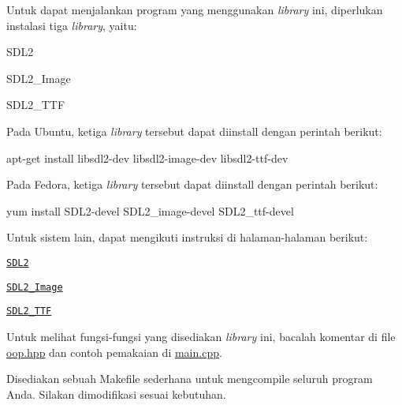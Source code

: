 Untuk dapat menjalankan program yang menggunakan {\itshape library} ini, diperlukan instalasi tiga {\itshape library}, yaitu\+:


\begin{DoxyItemize}
\item S\+D\+L2
\item S\+D\+L2\+\_\+\+Image
\item S\+D\+L2\+\_\+\+T\+TF
\end{DoxyItemize}

Pada Ubuntu, ketiga {\itshape library} tersebut dapat diinstall dengan perintah berikut\+: \begin{DoxyVerb}apt-get install libsdl2-dev libsdl2-image-dev libsdl2-ttf-dev
\end{DoxyVerb}


Pada Fedora, ketiga {\itshape library} tersebut dapat diinstall dengan perintah berikut\+: \begin{DoxyVerb}yum install SDL2-devel SDL2_image-devel SDL2_ttf-devel
\end{DoxyVerb}


Untuk sistem lain, dapat mengikuti instruksi di halaman-\/halaman berikut\+:
\begin{DoxyItemize}
\item \href{http://lazyfoo.net/tutorials/SDL/01_hello_SDL/index.php}{\tt S\+D\+L2}
\item \href{https://www.libsdl.org/projects/SDL_image/}{\tt S\+D\+L2\+\_\+\+Image}
\item \href{https://www.libsdl.org/projects/SDL_ttf/}{\tt S\+D\+L2\+\_\+\+T\+TF}
\end{DoxyItemize}

Untuk melihat fungsi-\/fungsi yang disediakan {\itshape library} ini, bacalah komentar di file {\ttfamily \mbox{\hyperlink{oop_8hpp}{oop.\+hpp}}} dan contoh pemakaian di {\ttfamily \mbox{\hyperlink{main_8cpp}{main.\+cpp}}}.

Disediakan sebuah Makefile sederhana untuk mengcompile seluruh program Anda. Silakan dimodifikasi sesuai kebutuhan. 